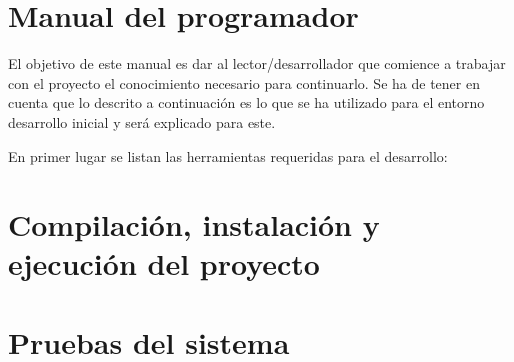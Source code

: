 \section{Manual del programador}
El objetivo de este manual es dar al lector/desarrollador que comience a
trabajar con el proyecto el conocimiento necesario para continuarlo. Se ha de
tener en cuenta que lo descrito a continuación es lo que se ha utilizado para el
entorno desarrollo inicial y será explicado para este.

En primer lugar se listan las herramientas requeridas para el desarrollo:



\section{Compilación, instalación y ejecución del proyecto}

\section{Pruebas del sistema}
